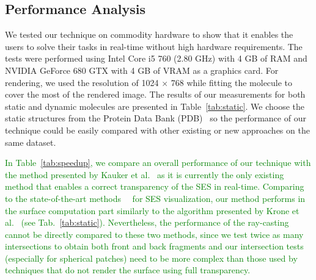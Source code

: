 \subsection{Performance Analysis}
\label{sec:performance}

We tested our technique on commodity hardware to show that it enables the users to solve their tasks in real-time without high hardware requirements.
The tests were performed using Intel Core i5 760 (2.80 GHz) with 4 GB of RAM and NVIDIA GeForce 680 GTX with 4 GB of VRAM as a graphics card.
For rendering, we used the resolution of 1024 $\times$ 768 while fitting the molecule to cover the most of the rendered image.
The results of our measurements for both static and dynamic molecules are presented in Table~\ref{tab:static}.
We choose the static structures from the Protein Data Bank (PDB)~\cite{sussman1998protein} so the performance of our technique could be easily compared with other existing or new approaches on the same dataset.

\textcolor{green}{
In Table~\ref{tab:speedup}, we compare an overall performance of our technique with the method presented by Kauker et al.~\cite{kauker2013rendering} as it is currently the only existing method that enables a correct transparency of the SES in real-time.
Comparing to the state-of-the-art methods~\cite{lindow2010accelerated}~\cite{krone2011parallel} for SES visualization, our method performs in the surface computation part similarly to the algorithm presented by Krone et al.~\cite{krone2011parallel} (see Tab.~\ref{tab:static}).
Nevertheless, the performance of the ray-casting cannot be directly compared to these two methods, since
we test twice as many intersections to obtain both front and back fragments and our intersection tests (especially for spherical patches) need to be more complex than those used by techniques that do not render the surface using full transparency.
}

\setlength{\tabcolsep}{4.5pt}

